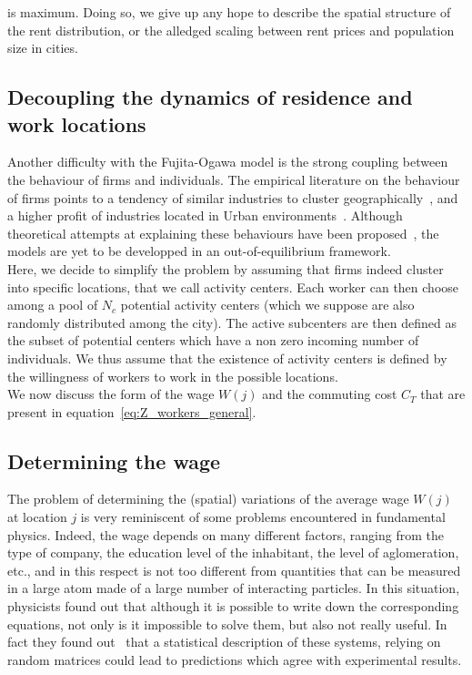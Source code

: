 is maximum. Doing so, we give up any hope to describe the spatial structure of the rent
distribution, or the alledged scaling between rent prices and population size in
cities.

\subsection{Decoupling the dynamics of residence and work locations}
\label{sub:decoupling_the_dynamics_of_}

Another difficulty with the Fujita-Ogawa model is the strong coupling between
the behaviour of firms and individuals. The empirical literature on the
behaviour of firms points to a tendency of similar industries to cluster
geographically~\cite{Marcon:2003, Duranton:2005, Marcon:2009}, and a higher
profit of industries located in Urban environments~\cite{Melo:2009}. Although
theoretical attempts at explaining these behaviours have been
proposed~\cite{Duranton:2004}, the models are yet to be developped in an
out-of-equilibrium framework.\\

Here, we decide to simplify the problem by assuming that firms indeed cluster
into specific locations, that we call activity centers. Each worker can then
choose among a pool of $N_c$ potential activity centers (which we suppose are
also randomly distributed among the city). The active subcenters are then
defined as the subset of potential centers which have a non zero incoming number
of individuals. We thus assume that the existence of activity centers is defined
by the willingness of workers to work in the possible locations.\\


We now discuss the form of the wage $W(j)$ and the commuting cost $C_T$ that are
present in equation~\ref{eq:Z_workers_general}. 

\subsection{Determining the wage}
\label{sub:determining_the_wage}

The problem of determining the (spatial) variations of the average wage $W(j)$
at location $j$ is very reminiscent of some problems encountered in fundamental
physics. Indeed, the wage depends on many different factors, ranging from the
type of company, the education level of the inhabitant, the level of
aglomeration, etc., and in this respect is not too different from quantities
that can be measured in a large atom made of a large number of interacting
particles. In this situation, physicists found out that although it is possible
to write down the corresponding equations, not only is it impossible to solve
them, but also not really useful. In fact they found out~\cite{Dyson:1962} that
a statistical description of these systems, relying on random matrices could
lead to predictions which agree with experimental results.\\


